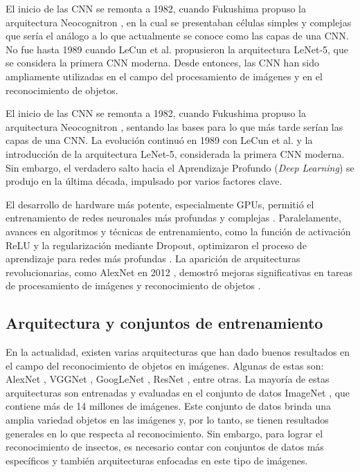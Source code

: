 El inicio de las CNN se remonta a 1982, cuando Fukushima propuso la arquitectura Neocognitron \cite{fukushima-1982}, en la cual se presentaban células simples y complejas que sería el análogo a lo que actualmente se conoce como las capas de una CNN. No fue hasta 1989 cuando LeCun et al. \cite{lecun-1989} propusieron la arquitectura LeNet-5, que se considera la primera CNN moderna. Desde entonces, las CNN han sido ampliamente utilizadas en el campo del procesamiento de imágenes y en el reconocimiento de objetos.

El inicio de las CNN se remonta a 1982, cuando Fukushima propuso la arquitectura Neocognitron \cite{fukushima-1982}, sentando las bases para lo que más tarde serían las capas de una CNN. La evolución continuó en 1989 con LeCun et al. \cite{lecun-1989} y la introducción de la arquitectura LeNet-5, considerada la primera CNN moderna. Sin embargo, el verdadero salto hacia el Aprendizaje Profundo (\textit{Deep Learning}) se produjo en la última década, impulsado por varios factores clave.

El desarrollo de hardware más potente, especialmente GPUs, permitió el entrenamiento de redes neuronales más profundas y complejas \cite{alzubaidi-2021}. Paralelamente, avances en algoritmos y técnicas de entrenamiento, como la función de activación ReLU y la regularización mediante Dropout, optimizaron el proceso de aprendizaje para redes más profundas \cite{GU2018354}. La aparición de arquitecturas revolucionarias, como AlexNet en 2012 , demostró mejoras significativas en tareas de procesamiento de imágenes y reconocimiento de objetos \cite{russakovsky-2015}.


\subsection{Arquitectura y conjuntos de entrenamiento}

En la actualidad, existen varias arquitecturas que han dado buenos resultados en el campo del reconocimiento de objetos en imágenes. Algunas de estas son: AlexNet \cite{russakovsky-2015}, VGGNet \cite{simonyan2014very}, GoogLeNet \cite{7298594}, ResNet \cite{he2016deep}, entre otras. La mayoría de estas arquitecturas son entrenadas y evaluadas en el conjunto de datos ImageNet \cite{ImageNet}, que contiene más de 14 millones de imágenes. Este conjunto de datos brinda una amplia variedad objetos en las imágenes y, por lo tanto, se tienen resultados generales en lo que respecta al reconocimiento. Sin embargo, para lograr el reconocimiento de insectos, es necesario contar con conjuntos de datos más específicos y también arquitecturas enfocadas en este tipo de imágenes. 

